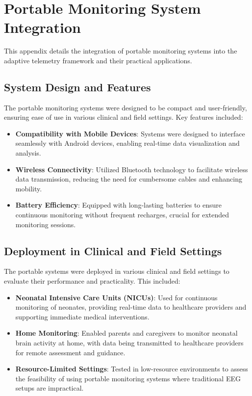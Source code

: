 \documentclass[12pt,journal,compsoc]{IEEEtran}
\begin{document}
\section{Portable Monitoring System Integration}
This appendix details the integration of portable monitoring systems into the adaptive telemetry framework and their practical applications.

\subsection{System Design and Features}
The portable monitoring systems were designed to be compact and user-friendly, ensuring ease of use in various clinical and field settings. Key features included:
\begin{itemize}
    \item \textbf{Compatibility with Mobile Devices}: Systems were designed to interface seamlessly with Android devices, enabling real-time data visualization and analysis.
    \item \textbf{Wireless Connectivity}: Utilized Bluetooth technology to facilitate wireless data transmission, reducing the need for cumbersome cables and enhancing mobility.
    \item \textbf{Battery Efficiency}: Equipped with long-lasting batteries to ensure continuous monitoring without frequent recharges, crucial for extended monitoring sessions.
\end{itemize}

\subsection{Deployment in Clinical and Field Settings}
The portable systems were deployed in various clinical and field settings to evaluate their performance and practicality. This included:
\begin{itemize}
    \item \textbf{Neonatal Intensive Care Units (NICUs)}: Used for continuous monitoring of neonates, providing real-time data to healthcare providers and supporting immediate medical interventions.
    \item \textbf{Home Monitoring}: Enabled parents and caregivers to monitor neonatal brain activity at home, with data being transmitted to healthcare providers for remote assessment and guidance.
    \item \textbf{Resource-Limited Settings}: Tested in low-resource environments to assess the feasibility of using portable monitoring systems where traditional EEG setups are impractical.
\end{itemize}
\end{document}
